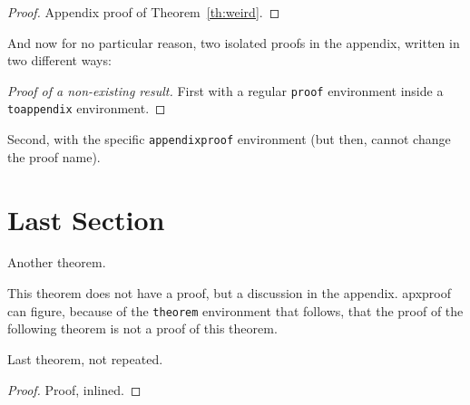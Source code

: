 \begin{proof}
  Appendix proof of Theorem~\ref{th:weird}.
\end{proof}

\begin{toappendix}
And now for no particular reason, two isolated proofs in the appendix,
  written in two different ways:

  \begin{proof}[Proof of a non-existing result]
    First with a regular \texttt{proof} environment inside a
    \texttt{toappendix} environment.
  \end{proof}
\end{toappendix}

\begin{appendixproof}
  Second, with the specific \texttt{appendixproof} environment (but then,
  cannot change the proof name).
\end{appendixproof}

\section{Last Section}

\begin{theoremrep}
  Another theorem.
\end{theoremrep}

\begin{toappendix}
  This theorem does not have a proof, but a discussion in the appendix.
  \textsf{apxproof} can figure, because of the \verb|theorem| environment
  that follows, that the proof of the following theorem is not a proof of
  this theorem.
\end{toappendix}

\begin{theorem}
  Last theorem, not repeated.
\end{theorem}

\begin{proof}
  Proof, inlined.
\end{proof}





